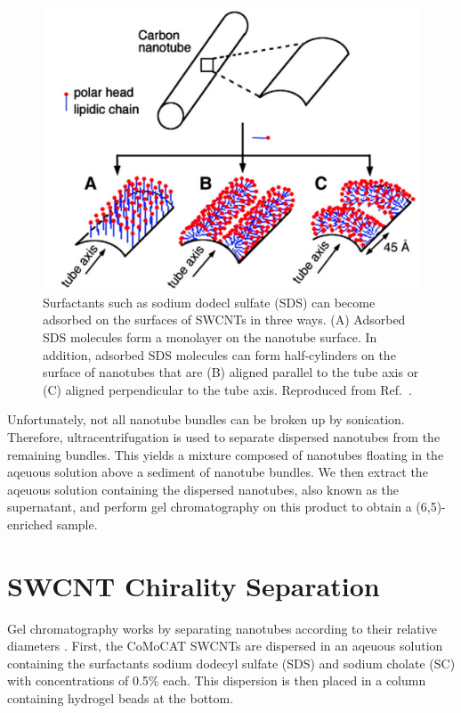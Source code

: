 \begin{figure}[h]
\centering
\includegraphics[scale=0.3]{images/chapter_methods/surfactant_tkalya}
\caption{Surfactants such as sodium dodecl sulfate (SDS) can become adsorbed on the surfaces of SWCNTs in three ways. (A) Adsorbed SDS molecules form a monolayer on the nanotube surface. In addition, adsorbed SDS molecules can form half-cylinders on the surface of nanotubes that are (B) aligned parallel to the tube axis or (C) aligned perpendicular to the tube axis. Reproduced from Ref.\ \cite{richard2003supramolecular}. }
\label{fig:sds_molecule}
\end{figure}

Unfortunately, not all nanotube bundles can be broken up by sonication. Therefore, ultracentrifugation is used to separate dispersed nanotubes from the remaining bundles. This yields a mixture composed of nanotubes floating in the aqeuous solution above a sediment of nanotube bundles. We then extract the aqeuous solution containing the dispersed nanotubes, also known as the supernatant, and perform gel chromatography on this product to obtain a (6,5)-enriched sample.

\section{SWCNT Chirality Separation}
Gel chromatography works by separating nanotubes according to their relative diameters \cite{ichinose2017extraction}. First, the CoMoCAT SWCNTs are dispersed in an aqeuous solution containing the surfactants sodium dodecyl sulfate (SDS) and sodium cholate (SC) with concentrations of 0.5\% each. This dispersion is then placed in a column containing hydrogel beads at the bottom.

